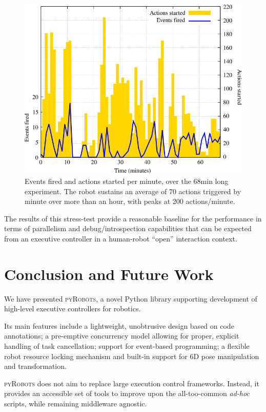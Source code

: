 \documentclass[letterpaper, 10pt, conference]{ieeeconf}      %
\newcommand{\pyRobots}{\textsc{pyRobots}}
\begin{document}
\begin{figure}
    \centering
    \includegraphics[width=0.9\columnwidth]{croquignole-expe}
    \caption{Events fired and actions started per minute, over the 68min long
    experiment. The robot sustains an average of 70 actions triggered by minute over
    more than an hour, with peaks at 200 actions/minute.}
    \label{croq_actions}
\end{figure}

The results of this stress-test provide a reasonable baseline for the
performance in terms of parallelism and debug/introspection capabilities that
can be expected from an executive controller in a human-robot ``open''
interaction context.

\section{Conclusion and Future Work}


We have presented \pyRobots{}, a novel Python library supporting
development of high-level executive controllers for robotics.

Its main features include a lightweight, unobtrusive design based on code
annotations; a pre-emptive concurrency model allowing for proper, explicit
handling of task cancellation; support for event-based programming; a flexible
robot resource locking mechanism and built-in support for 6D pose
manipulation and transformation.

\pyRobots{} does not aim to replace large execution control frameworks. Instead,
it provides an accessible set of tools to improve upon the all-too-common
\emph{ad-hoc} scripts, while remaining middleware agnostic.
\end{document}
